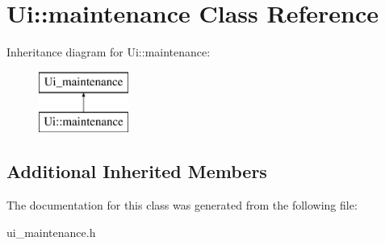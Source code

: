 \hypertarget{class_ui_1_1maintenance}{}\section{Ui\+:\+:maintenance Class Reference}
\label{class_ui_1_1maintenance}
Inheritance diagram for Ui\+:\+:maintenance\+:\begin{figure}[H]
\begin{center}
\leavevmode
\includegraphics[height=2.000000cm]{class_ui_1_1maintenance}
\end{center}
\end{figure}
\subsection*{Additional Inherited Members}


The documentation for this class was generated from the following file\+:\begin{DoxyCompactItemize}
\item 
ui\+\_\+maintenance.\+h\end{DoxyCompactItemize}
